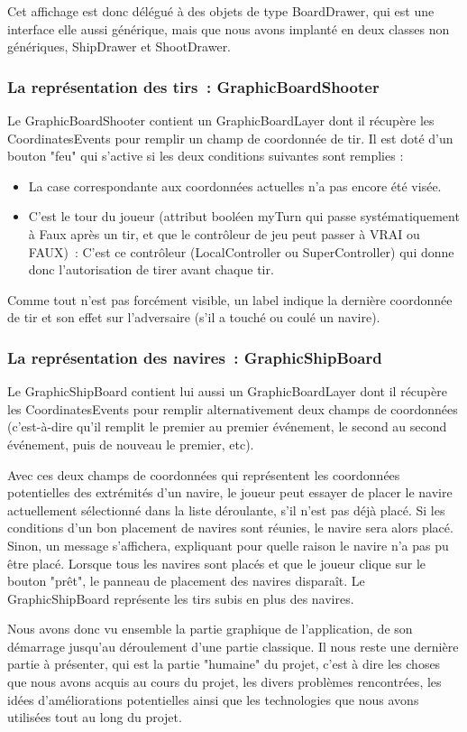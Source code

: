 	Cet affichage est donc délégué à des objets de type BoardDrawer, qui est une interface elle aussi générique, mais que nous avons implanté en deux classes non génériques, ShipDrawer et ShootDrawer.

\subsubsection{La représentation des tirs~: GraphicBoardShooter}

	Le GraphicBoardShooter contient un GraphicBoardLayer dont il récupère les CoordinatesEvents pour remplir un champ de coordonnée de tir.
Il est doté d'un bouton "feu" qui s'active si les deux conditions suivantes sont remplies :
\begin{itemize}
\item La case correspondante aux coordonnées actuelles n'a pas encore été visée.
\item C'est le tour du joueur (attribut booléen myTurn qui passe systématiquement à Faux après un tir, et que le contrôleur de jeu peut passer à VRAI ou FAUX)~: C'est ce contrôleur (LocalController ou SuperController) qui donne donc l'autorisation de tirer avant chaque tir.
\end{itemize}


Comme tout n'est pas forcément visible, un label indique la dernière coordonnée de tir et son effet sur l'adversaire (s'il a touché ou coulé un navire).

\subsubsection{La représentation des navires~: GraphicShipBoard}

	Le GraphicShipBoard contient lui aussi un GraphicBoardLayer dont il récupère les CoordinatesEvents pour remplir alternativement deux champs de coordonnées (c'est-à-dire qu'il remplit le premier au premier événement, le second au second événement, puis de nouveau le premier, etc). \newline
	
	Avec ces deux champs de coordonnées qui représentent les coordonnées potentielles des extrémités d'un navire, le joueur peut essayer de placer le navire actuellement sélectionné dans la liste déroulante, s'il n'est pas déjà placé.
Si les conditions d'un bon placement de navires sont réunies, le navire sera alors placé. Sinon, un message s'affichera, expliquant pour quelle raison le navire n'a pas pu être placé.
\newline
	Lorsque tous les navires sont placés et que le joueur clique sur le bouton "prêt", le panneau de placement des navires disparaît.
	Le GraphicShipBoard représente les tirs subis en plus des navires. \newline
	
	Nous avons donc vu ensemble la partie graphique de l'application, de son démarrage jusqu'au déroulement d'une partie classique. Il nous reste une dernière partie à présenter, qui est la partie "humaine" du projet, c'est à dire les choses que nous avons acquis au cours du projet, les divers problèmes rencontrées, les idées d'améliorations potentielles ainsi que les technologies que nous avons utilisées tout au long du projet.
